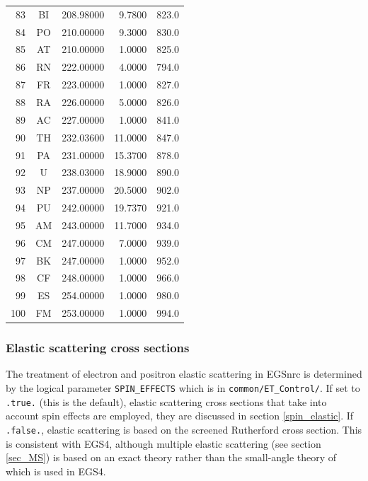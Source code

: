 \begin{longtable}{|rcrrr|}
83 & BI     &208.98000 &  9.7800    &823.0 \\
84 & PO     &210.00000 &  9.3000    &830.0 \\
85 & AT     &210.00000 &  1.0000    &825.0 \\
86 & RN     &222.00000 &  4.0000    &794.0 \\
87 & FR     &223.00000 &  1.0000    &827.0 \\
88 & RA     &226.00000 &  5.0000    &826.0 \\
89 & AC     &227.00000 &  1.0000    &841.0 \\
90 & TH     &232.03600 & 11.0000    &847.0 \\
91 & PA     &231.00000 & 15.3700    &878.0 \\
92 & U      &238.03000 & 18.9000    &890.0 \\
93 & NP     &237.00000 & 20.5000    &902.0 \\
94 & PU     &242.00000 & 19.7370    &921.0 \\
95 & AM     &243.00000 & 11.7000    &934.0 \\
96 & CM     &247.00000 &  7.0000    &939.0 \\
97 & BK     &247.00000 &  1.0000    &952.0 \\
98 & CF     &248.00000 &  1.0000    &966.0 \\
99 & ES     &254.00000 &  1.0000    &980.0 \\
100& FM     &253.00000 &  1.0000    &994.0 \\
\end{longtable}

\subsubsection{Elastic scattering cross sections}
\label{elastic}
\setcounter{equation}{0}

The treatment of electron and positron elastic
scattering in EGSnrc is determined by the logical parameter
{\tt SPIN\_EFFECTS} which is in {\tt common/ET\_Control/}.
If set to {\tt .true.} (this is the default),
elastic scattering cross sections
that take into account spin effects are employed, they
are discussed in section \ref{spin_elastic}. If {\tt .false.},
elastic scattering is based on the screened Rutherford cross section.
This is consistent with EGS4, although multiple elastic
scattering (see section \ref{sec_MS})
is based on an exact theory rather than the
small-angle theory of \Mol \cite{Mo48} which is used in EGS4.

